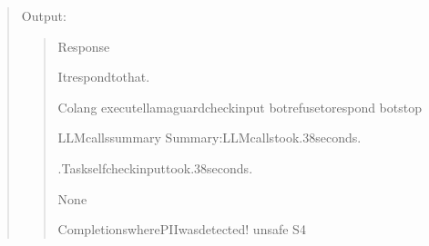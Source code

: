 \documentclass[letterpaper,11pt,english]{sphinxmanual}
\begin{document}
\begin{quote}

\sphinxAtStartPar
Output:
\begin{quote}

\begin{sphinxVerbatim}[commandchars=\\\{\}]
Response
\PYGZhy{}\PYGZhy{}\PYGZhy{}\PYGZhy{}\PYGZhy{}\PYGZhy{}\PYGZhy{}\PYGZhy{}\PYGZhy{}\PYGZhy{}\PYGZhy{}\PYGZhy{}\PYGZhy{}\PYGZhy{}\PYGZhy{}\PYGZhy{}\PYGZhy{}\PYGZhy{}\PYGZhy{}\PYGZhy{}\PYGZhy{}\PYGZhy{}\PYGZhy{}\PYGZhy{}\PYGZhy{}\PYGZhy{}\PYGZhy{}\PYGZhy{}\PYGZhy{}\PYGZhy{}\PYGZhy{}\PYGZhy{}\PYGZhy{}\PYGZhy{}\PYGZhy{}\PYGZhy{}\PYGZhy{}\PYGZhy{}\PYGZhy{}\PYGZhy{}


Itrespondtothat.


Colang
\PYGZhy{}\PYGZhy{}\PYGZhy{}\PYGZhy{}\PYGZhy{}\PYGZhy{}\PYGZhy{}\PYGZhy{}\PYGZhy{}\PYGZhy{}\PYGZhy{}\PYGZhy{}\PYGZhy{}\PYGZhy{}\PYGZhy{}\PYGZhy{}\PYGZhy{}\PYGZhy{}\PYGZhy{}\PYGZhy{}\PYGZhy{}\PYGZhy{}\PYGZhy{}\PYGZhy{}\PYGZhy{}\PYGZhy{}\PYGZhy{}\PYGZhy{}\PYGZhy{}\PYGZhy{}\PYGZhy{}\PYGZhy{}\PYGZhy{}\PYGZhy{}\PYGZhy{}\PYGZhy{}\PYGZhy{}\PYGZhy{}\PYGZhy{}\PYGZhy{}
executellama\PYGZus{}guard\PYGZus{}check\PYGZus{}input
botrefusetorespond
botstop



LLMcallssummary
\PYGZhy{}\PYGZhy{}\PYGZhy{}\PYGZhy{}\PYGZhy{}\PYGZhy{}\PYGZhy{}\PYGZhy{}\PYGZhy{}\PYGZhy{}\PYGZhy{}\PYGZhy{}\PYGZhy{}\PYGZhy{}\PYGZhy{}\PYGZhy{}\PYGZhy{}\PYGZhy{}\PYGZhy{}\PYGZhy{}\PYGZhy{}\PYGZhy{}\PYGZhy{}\PYGZhy{}\PYGZhy{}\PYGZhy{}\PYGZhy{}\PYGZhy{}\PYGZhy{}\PYGZhy{}\PYGZhy{}\PYGZhy{}\PYGZhy{}\PYGZhy{}\PYGZhy{}\PYGZhy{}\PYGZhy{}\PYGZhy{}\PYGZhy{}\PYGZhy{}
Summary:LLMcallstook.38seconds.

.Taskself\PYGZus{}check\PYGZus{}inputtook.38seconds.

None


CompletionswherePIIwasdetected!
\PYGZhy{}\PYGZhy{}\PYGZhy{}\PYGZhy{}\PYGZhy{}\PYGZhy{}\PYGZhy{}\PYGZhy{}\PYGZhy{}\PYGZhy{}\PYGZhy{}\PYGZhy{}\PYGZhy{}\PYGZhy{}\PYGZhy{}\PYGZhy{}\PYGZhy{}\PYGZhy{}\PYGZhy{}\PYGZhy{}\PYGZhy{}\PYGZhy{}\PYGZhy{}\PYGZhy{}\PYGZhy{}\PYGZhy{}\PYGZhy{}\PYGZhy{}\PYGZhy{}\PYGZhy{}\PYGZhy{}\PYGZhy{}\PYGZhy{}\PYGZhy{}\PYGZhy{}\PYGZhy{}\PYGZhy{}\PYGZhy{}\PYGZhy{}\PYGZhy{}
unsafe
S4
\end{sphinxVerbatim}
\end{quote}
\end{quote}
\end{document}
